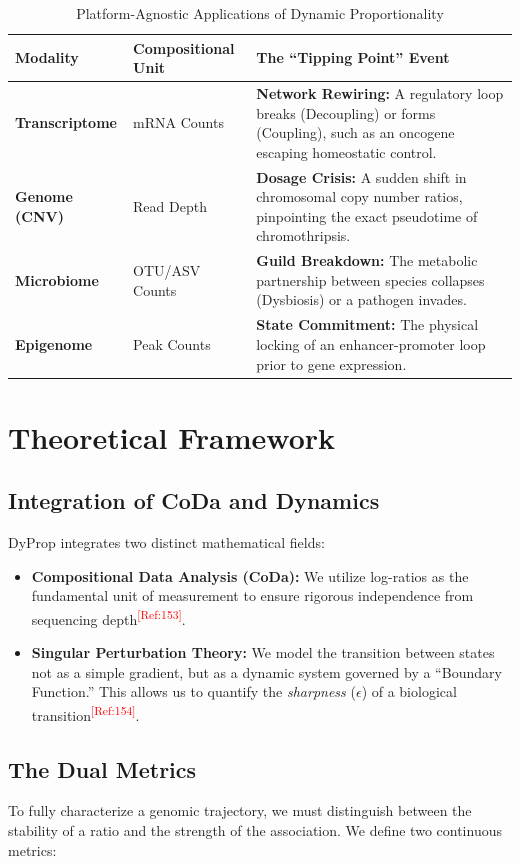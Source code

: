 \documentclass[11pt, a4paper]{article}
\newcommand{\tref}[1]{\textsuperscript{\textcolor{red}{[Ref:#1]}}}
\begin{document}
\begin{table}[h]
\centering
\caption{Platform-Agnostic Applications of Dynamic Proportionality}
\label{tab:applications}
\begin{tabular}{@{}lp{4cm}p{6cm}@{}}
\toprule
\textbf{Modality} & \textbf{Compositional Unit} & \textbf{The ``Tipping Point'' Event} \\ \midrule
\textbf{Transcriptome} & mRNA Counts & \textbf{Network Rewiring:} A regulatory loop breaks (Decoupling) or forms (Coupling), such as an oncogene escaping homeostatic control. \\
\textbf{Genome (CNV)} & Read Depth & \textbf{Dosage Crisis:} A sudden shift in chromosomal copy number ratios, pinpointing the exact pseudotime of chromothripsis. \\
\textbf{Microbiome} & OTU/ASV Counts & \textbf{Guild Breakdown:} The metabolic partnership between species collapses (Dysbiosis) or a pathogen invades. \\
\textbf{Epigenome} & Peak Counts & \textbf{State Commitment:} The physical locking of an enhancer-promoter loop prior to gene expression. \\ \bottomrule
\end{tabular}
\end{table}

\section{Theoretical Framework}

\subsection{Integration of CoDa and Dynamics}
DyProp integrates two distinct mathematical fields:
\begin{itemize}
    \item \textbf{Compositional Data Analysis (CoDa):} We utilize log-ratios as the fundamental unit of measurement to ensure rigorous independence from sequencing depth\tref{153}.
    \item \textbf{Singular Perturbation Theory:} We model the transition between states not as a simple gradient, but as a dynamic system governed by a ``Boundary Function.'' This allows us to quantify the \textit{sharpness} ($\epsilon$) of a biological transition\tref{154}.
\end{itemize}

\subsection{The Dual Metrics}
To fully characterize a genomic trajectory, we must distinguish between the stability of a ratio and the strength of the association. We define two continuous metrics:
\end{document}
